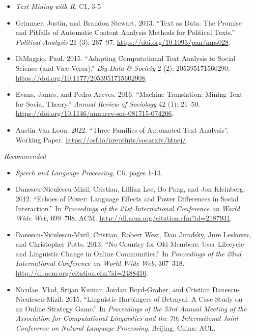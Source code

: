 \documentclass[
  10pt,
]{article}
\providecommand{\tightlist}{%
  \setlength{\itemsep}{0pt}\setlength{\parskip}{0pt}}
\begin{document}
\begin{itemize}
\tightlist
\item
  \emph{Text Mining with R}, C1, 3-5
\item
  Grimmer, Justin, and Brandon Stewart. 2013. ``Text as Data: The
  Promise and Pitfalls of Automatic Content Analysis Methods for
  Political Texts.'' \emph{Political Analysis} 21 (3): 267--97.
  \url{https://doi.org/10.1093/pan/mps028}.
\item
  DiMaggio, Paul. 2015. ``Adapting Computational Text Analysis to Social
  Science (and Vice Versa).'' \emph{Big Data \& Society} 2 (2):
  205395171560290. \url{https://doi.org/10.1177/2053951715602908}.
\item
  Evans, James, and Pedro Aceves. 2016. ``Machine Translation: Mining
  Text for Social Theory.'' \emph{Annual Review of Sociology} 42 (1):
  21--50. \url{https://doi.org/10.1146/annurev-soc-081715-074206}.
\item
  Austin Van Loon. 2022. ``Three Families of Automated Text Analysis''.
  Working Paper. \url{https://osf.io/preprints/socarxiv/htnej/}
\end{itemize}

\emph{Recommended}

\begin{itemize}
\tightlist
\item
  \emph{Speech and Language Processing}, C6, pages 1-13.
\item
  Danescu-Niculescu-Mizil, Cristian, Lillian Lee, Bo Pang, and Jon
  Kleinberg. 2012. ``Echoes of Power: Language Effects and Power
  Differences in Social Interaction.'' In \emph{Proceedings of the 21st
  International Conference on World Wide Web}, 699--708. ACM.
  \url{http://dl.acm.org/citation.cfm?id=2187931}.
\item
  Danescu-Niculescu-Mizil, Cristian, Robert West, Dan Jurafsky, Jure
  Leskovec, and Christopher Potts. 2013. ``No Country for Old Members:
  User Lifecycle and Linguistic Change in Online Communities.'' In
  \emph{Proceedings of the 22nd International Conference on World Wide
  Web}, 307--318. \url{http://dl.acm.org/citation.cfm?id=2488416}.
\item
  Niculae, Vlad, Srijan Kumar, Jordan Boyd-Graber, and Cristian
  Danescu-Niculescu-Mizil. 2015. ``Linguistic Harbingers of Betrayal: A
  Case Study on an Online Strategy Game.'' In \emph{Proceedings of the
  53rd Annual Meeting of the Association for Computational Linguistics
  and the 7th International Joint Conference on Natural Language
  Processing}. Beijing, China: ACL.
\end{itemize}
\end{document}
